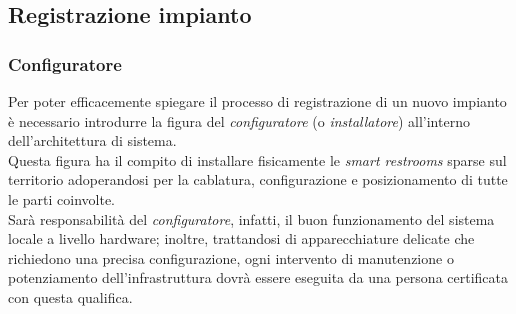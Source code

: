 \documentclass[12pt]{article}
\begin{document}
\subsection{Registrazione impianto}
\subsubsection{Configuratore} Per poter efficacemente spiegare il processo di registrazione di un nuovo impianto è necessario introdurre la figura del \textit{configuratore} (o \textit{installatore}) all'interno dell'architettura di sistema.\\
Questa figura ha il compito di installare fisicamente le \textit{smart restrooms} sparse sul territorio adoperandosi per la cablatura, configurazione e posizionamento di tutte le parti coinvolte.\\
Sarà responsabilità del \textit{configuratore}, infatti, il buon funzionamento del sistema locale a livello hardware; inoltre, trattandosi di apparecchiature delicate che richiedono una precisa configurazione, ogni intervento di manutenzione o potenziamento dell'infrastruttura dovrà essere eseguita da una persona certificata con questa qualifica. 
\end{document}
